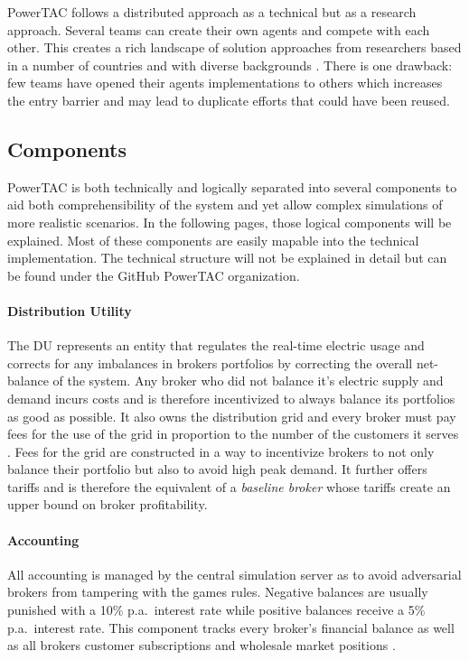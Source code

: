 \ac{PowerTAC} follows a distributed approach as a technical but as a research approach. Several teams can create their own
agents and compete with each other. This creates a rich landscape of solution approaches from researchers based in a
number of countries and with diverse backgrounds \cite[]{ketter2015competitive}. There is one drawback: few teams have opened
their agents implementations to others which increases the entry barrier and may lead to duplicate efforts that could
have been reused.

\subsection{Components}%
\label{sub:components}



\ac {PowerTAC} is both technically and logically separated into several components to aid both comprehensibility of the
system and yet allow complex simulations of more realistic scenarios. In the following pages, those logical components
will be explained. Most of these components are easily mapable into the technical implementation. The technical
structure will not be explained in detail but can be found under the GitHub \ac{PowerTAC} organization.


\paragraph{Distribution Utility} The \ac{DU} represents an entity that regulates the real-time electric usage and
corrects for any imbalances in brokers portfolios by correcting the overall net-balance of the system. Any broker who
did not balance it's electric supply and demand incurs costs and is therefore incentivized to always balance its
portfolios as good as possible. It also owns the distribution grid and every broker must pay fees for the use of the
grid in proportion to the number of the customers it serves \citep[p.10]{ketter2018powertac}. Fees for the grid are
constructed in a way to incentivize brokers to not only balance their portfolio but also to avoid high peak demand.
It further offers tariffs and is therefore the equivalent of a \emph{baseline broker} whose tariffs create an upper bound on broker profitability.

\paragraph{Accounting} All accounting is managed by the central simulation server as to avoid adversarial brokers
from tampering with the games rules. Negative balances are usually punished with a 10\% p.a.\ interest rate while
positive balances receive a 5\% p.a.\ interest rate. This component tracks every broker's financial balance as well as
all brokers customer subscriptions and wholesale market positions \citep[p.11]{ketter2018powertac}.

